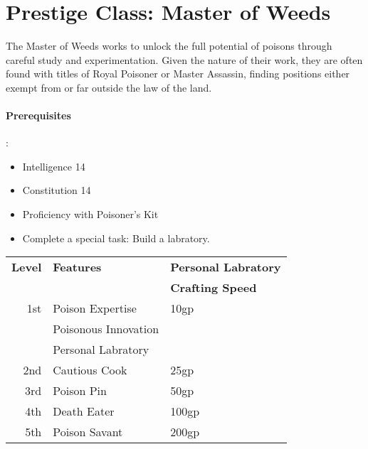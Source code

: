 
\usepackage{color} %
\usepackage{fancyhdr} %
\newif\ifdm

\newcommand{\wherein}[1]{\textbf{ \LARGE Wherein} \begin{itemize} #1 \end{itemize}} 
\newcommand{\witem}[1]{\item[$\cdot$] {\em #1} }
\newcommand{\dmonly}[1]{\ifdm { \color{red} #1 } \else { } \fi}
\newcommand{\HS}{H\'arom-s\'al}



\dmonly{ {\LARGE DM COPY} }



\section*{Prestige Class: Master of Weeds}

The Master of Weeds works to unlock the full potential of poisons through careful study and experimentation.
Given the nature of their work, they are often found with titles of Royal Poisoner or Master Assassin, finding positions either exempt from or far outside the law of the land.


\paragraph*{Prerequisites}:
\begin{itemize}
\item  Intelligence 14
\item  Constitution 14
\item  Proficiency with Poisoner's Kit
\item  Complete a special task: Build a labratory.
\end{itemize}
    


\begin{tabular}{rll}
{\bf Level} & {\bf Features} & {\bf Personal Labratory} \\&&{\bf Crafting Speed} \\
1st & Poison Expertise            & 10gp \\
    & Poisonous Innovation  &\\
    & Personal Labratory    &\\
2nd & Cautious Cook           & 25gp  \\
3rd & Poison Pin           & 50gp     \\
4th & Death Eater           & 100gp   \\
5th & Poison Savant           & 200gp \\
\end{tabular}

